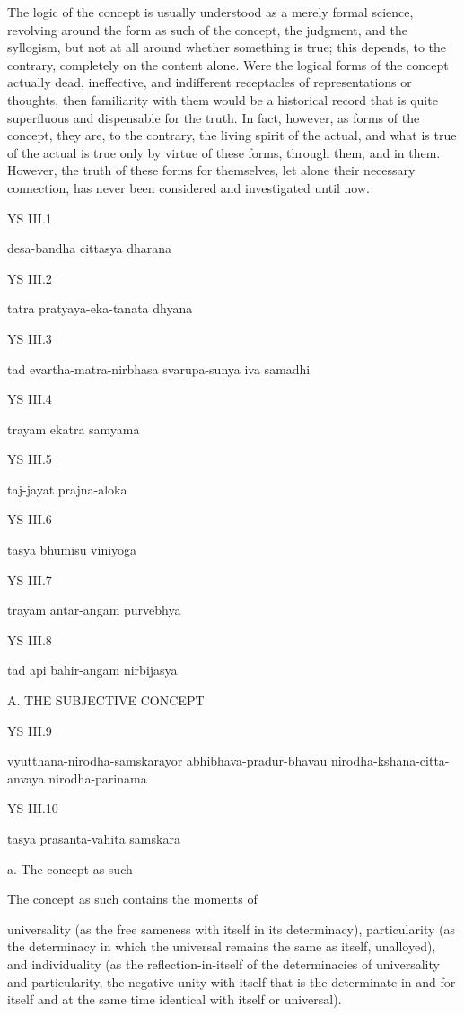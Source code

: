 The logic of the concept is
usually understood as a merely formal science,
revolving around the form as such of
the concept, the judgment, and the syllogism,
but not at all around whether something is true;
this depends, to the contrary, completely on the content alone.
Were the logical forms of the concept actually dead, ineffective,
and indifferent receptacles of representations or thoughts,
then familiarity with them would be a historical record that
is quite superfluous and dispensable for the truth.
In fact, however, as forms of the concept,
they are, to the contrary,
the living spirit of the actual,
and what is true of the actual is true
only by virtue of these forms, through them, and in them.
However, the truth of these forms for themselves,
let alone their necessary connection,
has never been considered and investigated until now.

YS III.1

desa-bandha cittasya dharana

YS III.2

tatra pratyaya-eka-tanata dhyana

YS III.3

tad evartha-matra-nirbhasa svarupa-sunya iva samadhi

YS III.4

trayam ekatra samyama

YS III.5

taj-jayat prajna-aloka

YS III.6

tasya bhumisu viniyoga

YS III.7

trayam antar-angam purvebhya

YS III.8

tad api bahir-angam nirbijasya

A. THE SUBJECTIVE CONCEPT

YS III.9

vyutthana-nirodha-samskarayor abhibhava-pradur-bhavau
nirodha-kshana-citta-anvaya nirodha-parinama

YS III.10

tasya prasanta-vahita samskara

a. The concept as such

The concept as such contains the moments of

universality
(as the free sameness with itself in its determinacy),
particularity
(as the determinacy in which
the universal remains the same as itself, unalloyed),
and individuality
(as the reflection-in-itself of
the determinacies of universality and particularity,
the negative unity with itself
that is the determinate in and for itself
and at the same time identical with itself or universal).

